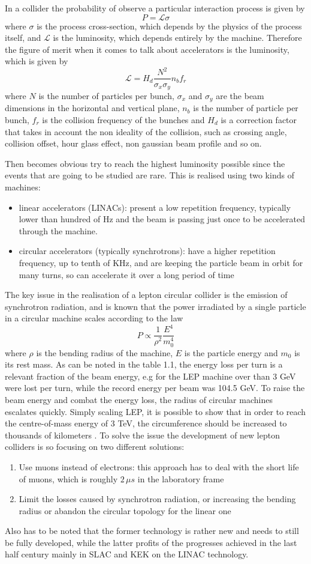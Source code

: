 In a collider the probability of observe a particular interaction process is given by
\[
P = \mathscr{L} \sigma
\]
where $\sigma$ is the process cross-section, which depends by the physics of the process itself, and $\mathscr{L}$ is the luminosity, which depends entirely by the machine.
Therefore the figure of merit when it comes to talk about accelerators is the luminosity, which is given by
\[
\mathscr{L} = H_d \frac{N^2}{\sigma_x \sigma_y} n_b f_r
\]
where $N$ is the number of particles per bunch, $\sigma_x$ and $\sigma_y$ are the beam dimensions in the horizontal and vertical plane, $n_b$ is the number of particle per bunch, $f_r$ is the collision frequency of the bunches and $H_d$ is a correction factor that takes in account the non ideality of the collision, such as crossing angle, collision offset, hour glass effect, non gaussian beam profile and so on.

Then becomes obvious try to reach the highest luminosity possible since the events that are going to be studied are rare. This is realised using two kinds of machines:
\begin{itemize}
\item linear accelerators (LINACs): present a low repetition frequency, typically lower than hundred of Hz and the beam is passing just once to be accelerated through the machine.
\item circular accelerators (typically synchrotrons): have a higher repetition frequency, up to tenth of KHz, and are keeping the particle beam in orbit for many turns, so can accelerate it over a long period of time
\end{itemize}
The key issue in the realisation of a lepton circular collider is the emission of synchrotron radiation, and is known that the power irradiated by a single particle in a circular machine scales according to the law
\[
P \propto \frac{1}{\rho^2} \frac{E^4}{m_0^4}
\]
where $\rho$ is the bending radius of the machine, $E$ is the particle energy and $m_0$ is its rest mass. As can be noted in the table 1.1, the energy loss per turn is a relevant fraction of the beam energy, e.g for the LEP machine over than 3 GeV were lost per turn, while the record energy per beam was 104.5 GeV. To raise the beam energy and combat the energy loss, the radius of circular machines escalates quickly. Simply scaling LEP, it is possible to show that in order to reach the centre-of-mass energy of 3 TeV, the circumference should be increased to thousands of kilometers \cite{nature:CLIC}.
To solve the issue the development of new lepton colliders is so focusing on two different solutions:
\begin{enumerate}
\item Use muons instead of electrons: this approach has to deal with the short life of muons, which is roughly $2 \, \mu s$ in the laboratory frame
\item Limit the losses caused by synchrotron radiation, or increasing the bending radius or abandon the circular topology for the linear one
\end{enumerate}
Also has to be noted that the former technology is rather new and needs to still be fully developed, while the latter profits of the progresses achieved in the last half century mainly in SLAC and KEK on the LINAC technology.


